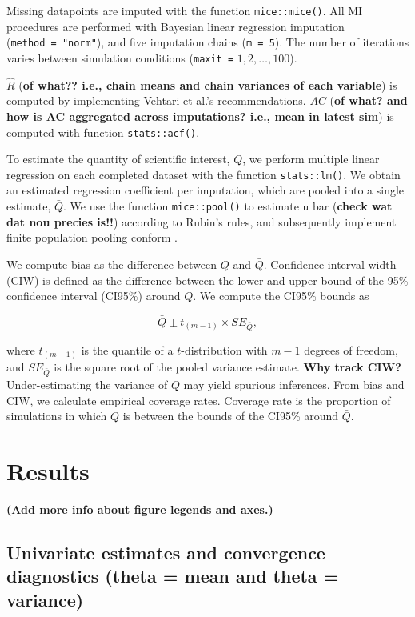 \documentclass[Royal,times,sageh]{sagej}
\begin{document}
Missing datapoints are imputed with the function \texttt{mice::mice()}.
All MI procedures are performed with Bayesian linear regression
imputation (\texttt{method\ =\ "norm"}), and five imputation chains
(\texttt{m\ =\ 5}). The number of iterations varies between simulation
conditions (\texttt{maxit\ =} \(1, 2, \dots, 100\)).

\(\widehat{R}\) (\textbf{of what?? i.e., chain means and chain variances
of each variable}) is computed by implementing Vehtari et al.'s
\citeyearpar{veht19} recommendations. \(AC\) (\textbf{of what? and how
is AC aggregated across imputations? i.e., mean in latest sim}) is
computed with function \texttt{stats::acf()}.

To estimate the quantity of scientific interest, \(Q\), we perform
multiple linear regression on each completed dataset with the function
\texttt{stats::lm()}. We obtain an estimated regression coefficient per
imputation, which are pooled into a single estimate, \(\bar{Q}\). We use
the function \texttt{mice::pool()} to estimate u bar (\textbf{check wat
dat nou precies is!!}) according to Rubin's \citeyearpar{rubin87} rules,
and subsequently implement finite population pooling conform
\citet{vink14}.

We compute bias as the difference between \(Q\) and \(\bar{Q}\).
Confidence interval width (CIW) is defined as the difference between the
lower and upper bound of the 95\% confidence interval (CI95\%) around
\(\bar{Q}\). We compute the CI95\% bounds as

\[\bar{Q} \pm t_{(m-1)} \times SE_{\bar{Q}},\]

where \(t_{(m-1)}\) is the quantile of a \(t\)-distribution with \(m-1\)
degrees of freedom, and \(SE_{\bar{Q}}\) is the square root of the
pooled variance estimate. \textbf{Why track CIW?} Under-estimating the
variance of \(\bar{Q}\) may yield spurious inferences. From bias and
CIW, we calculate empirical coverage rates. Coverage rate is the
proportion of simulations in which \(Q\) is between the bounds of the
CI95\% around \(\bar{Q}\).

\hypertarget{results}{%
\section{Results}\label{results}}

\textbf{(Add more info about figure legends and axes.)}

\hypertarget{univariate-estimates-and-convergence-diagnostics-theta-mean-and-theta-variance}{%
\subsection{Univariate estimates and convergence diagnostics (theta =
mean and theta =
variance)}\label{univariate-estimates-and-convergence-diagnostics-theta-mean-and-theta-variance}}
\end{document}

